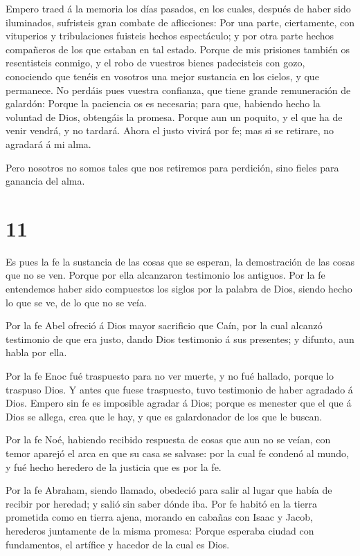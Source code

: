  Empero traed á la memoria los días pasados, en los cuales,
después de haber sido iluminados, sufristeis gran combate de
aflicciones:  Por una parte, ciertamente, con vituperios y
tribulaciones fuisteis hechos espectáculo; y por otra parte hechos
compañeros de los que estaban en tal estado.  Porque de mis
prisiones también os resentisteis conmigo, y el robo de vuestros bienes
padecisteis con gozo, conociendo que tenéis en vosotros una mejor
sustancia en los cielos, y que permanece.  No perdáis pues
vuestra confianza, que tiene grande remuneración de galardón:
 Porque la paciencia os es necesaria; para que, habiendo
hecho la voluntad de Dios, obtengáis la promesa.  Porque
aun un poquito, y el que ha de venir vendrá, y no tardará. 
Ahora el justo vivirá por fe; mas si se retirare, no agradará á mi alma.

 Pero nosotros no somos tales que nos retiremos para
perdición, sino fieles para ganancia del alma.

\hypertarget{section-10}{%
\section{11}\label{section-10}}

 Es pues la fe la sustancia de las cosas que se esperan, la
demostración de las cosas que no se ven.  Porque por ella
alcanzaron testimonio los antiguos.  Por la fe entendemos
haber sido compuestos los siglos por la palabra de Dios, siendo hecho lo
que se ve, de lo que no se veía.

 Por la fe Abel ofreció á Dios mayor sacrificio que Caín,
por la cual alcanzó testimonio de que era justo, dando Dios testimonio á
sus presentes; y difunto, aun habla por ella.

 Por la fe Enoc fué traspuesto para no ver muerte, y no fué
hallado, porque lo traspuso Dios. Y antes que fuese traspuesto, tuvo
testimonio de haber agradado á Dios.  Empero sin fe es
imposible agradar á Dios; porque es menester que el que á Dios se
allega, crea que le hay, y que es galardonador de los que le buscan.

 Por la fe Noé, habiendo recibido respuesta de cosas que aun
no se veían, con temor aparejó el arca en que su casa se salvase: por la
cual fe condenó al mundo, y fué hecho heredero de la justicia que es por
la fe.

 Por la fe Abraham, siendo llamado, obedeció para salir al
lugar que había de recibir por heredad; y salió sin saber dónde iba.
 Por fe habitó en la tierra prometida como en tierra ajena,
morando en cabañas con Isaac y Jacob, herederos juntamente de la misma
promesa:  Porque esperaba ciudad con fundamentos, el
artífice y hacedor de la cual es Dios.

